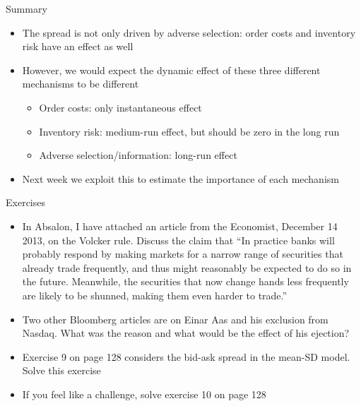 \documentclass[english,10pt]{beamer}
\begin{document}
\begin{frame}{Summary}
	\begin{itemize}
		\item The spread is not only driven by adverse selection: order costs and inventory risk have an effect as well
		\item However, we would expect the dynamic effect of these three different mechanisms to be different
		\begin{itemize}
			\item Order costs: only instantaneous effect 
			\item Inventory risk: medium-run effect, but should be zero in the long run
			\item Adverse selection/information: long-run effect 
		\end{itemize}
		\item Next week we exploit this to estimate the importance of each mechanism
	\end{itemize}
\end{frame}


\begin{frame}{Exercises}
	\begin{itemize}
		\item In Absalon, I have attached an article from the Economist, December 14 2013, on the Volcker rule. Discuss the claim that ``In practice banks will probably respond by making markets for a narrow range of securities that already trade frequently, and thus might reasonably be expected to do so in the future. Meanwhile, the securities that now change hands less frequently are likely to be shunned, making them even harder to trade.''
		\item Two other Bloomberg articles are on Einar Aas and his exclusion from Nasdaq. What was the reason and what would be the effect of his ejection?
		\item Exercise 9 on page 128 considers the bid-ask spread in the mean-SD model. Solve this exercise
		\item If you feel like a challenge, solve exercise 10 on page 128
	\end{itemize}
\end{frame}
\end{document}
